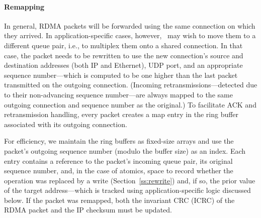 \paragraph{Remapping}
\label{ss:remapping}
In general, RDMA packets will be forwarded using the same connection on
which they arrived.  In application-specific cases, however,
\sword\ may wish to move them to a different queue pair, i.e., to
multiplex them onto a shared connection.  In that case, the packet
needs to be rewritten to use the new connection's source and
destination addresses (both IP and Ethernet), UDP port, and an
appropriate sequence number---which is computed to be one higher than
the last packet transmitted on the outgoing connection.  (Incoming
retransmissions---detected due to their non-advancing sequence
number---are always mapped to the same outgoing connection and
sequence number as the original.)  To facilitate ACK and
retransmission handling, every packet creates a map entry in
the ring buffer associated with its outgoing connection.

For efficiency, we maintain the ring buffers as fixed-size arrays and
use the packet's outgoing sequence number (modulo the buffer size) as
an index.  Each entry contains a reference to the packet's incoming
queue pair, its original sequence number, and, in the case of atomics,
space to record whether the operation was replaced by
a write (Section~\ref{ss:rewrite}) and, if so, the prior value of the
target address---which is tracked using application-specific logic
discussed below.
%
If the packet was remapped, both the invariant CRC (ICRC) of the RDMA
packet and the IP checksum must be updated.  


